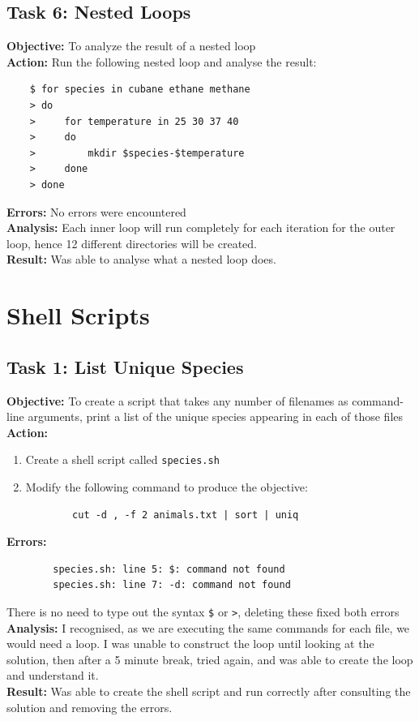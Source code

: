 \documentclass{article}
\begin{document}
\subsection{Task 6: Nested Loops}
%
\textbf{Objective:} To analyze the result of a nested loop\\
\textbf{Action:} Run the following nested loop and analyse the result:
\begin{verbatim}
    $ for species in cubane ethane methane
    > do
    >     for temperature in 25 30 37 40
    >     do
    >         mkdir $species-$temperature
    >     done
    > done
\end{verbatim}
\textbf{Errors:} No errors were encountered\\
\textbf{Analysis:} Each inner loop will run completely for each iteration for the outer loop, hence 12 different directories will be created.\\
\textbf{Result:} Was able to analyse what a nested loop does.
\section{Shell Scripts}
%
\subsection{Task 1: List Unique Species}
%
\textbf{Objective:} To create a script that takes any number of filenames as command-line arguments, print a list of the unique species appearing in each of those files\\
\textbf{Action:}
\begin{enumerate}
    \item Create a shell script called \texttt{species.sh}
    \item Modify the following command to produce the objective:
    \begin{verbatim}
        cut -d , -f 2 animals.txt | sort | uniq
    \end{verbatim}
\end{enumerate}
\textbf{Errors:}
    \begin{verbatim}
        species.sh: line 5: $: command not found
        species.sh: line 7: -d: command not found
    \end{verbatim}
    There is no need to type out the syntax \verb|$| or \verb|>|, deleting these fixed both errors
\textbf{Analysis:} I recognised, as we are executing the same commands for each file, we would need a loop. I was unable to construct the loop until looking at the solution, then after a 5 minute break, tried again, and was able to create the loop and understand it.\\
\textbf{Result:} Was able to create the shell script and run correctly after consulting the solution and removing the errors.
%
\end{document}
